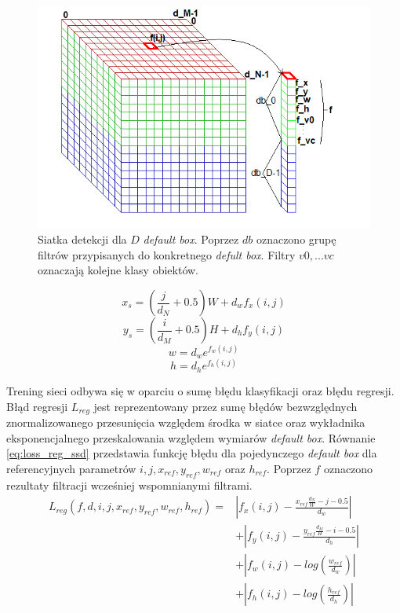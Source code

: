 \begin{figure}
    \centering
    \includegraphics[width=0.9\linewidth]{images/ssd_grid_marked.png}
    \caption{Siatka detekcji dla $D$ \emph{default box}. Poprzez $db$ oznaczono grupę filtrów przypisanych do konkretnego \emph{defult box}. Filtry $v0,...vc$ oznaczają kolejne klasy obiektów.}
    \label{fig:ssd_grid}
\end{figure}
\begin{equation}
x_s = (\frac{j}{d_N}+ 0.5)W + d_w f_x(i,j)
\label{eq:xs_ssd}
\end{equation}
\begin{equation}
y_s = (\frac{i}{d_M}+ 0.5)H + d_h f_y(i,j)
\label{eq:ys_ssd}
\end{equation}
\begin{equation}
w = d_we^{f_w(i,j)}
\label{eq:w_ssd}
\end{equation}
\begin{equation}
h = d_he^{f_h(i,j)}
\label{eq:h_ssd}
\end{equation}

Trening sieci odbywa się w oparciu o sumę błędu klasyfikacji oraz błędu regresji.
Błąd regresji $L_{reg}$ jest reprezentowany przez sumę błędów bezwzględnych znormalizowanego przesunięcia względem środka w siatce oraz wykładnika eksponencjalnego przeskalowania względem wymiarów \emph{default box}. 
Równanie \eqref{eq:loss_reg_ssd} przedstawia funkcję błędu dla pojedynczego \emph{default box} dla referencyjnych parametrów $i, j, x_{ref}, y_{ref}, w_{ref}$ oraz $h_{ref}$.
Poprzez $f$ oznaczono rezultaty filtracji wcześniej wspomnianymi filtrami.
\begin{equation}
\begin{aligned}
L_{reg}(f, d, i, j, x_{ref}, y_{ref}, w_{ref}, h_{ref}) 
=& |f_x(i,j) - \frac{x_{ref}\frac{d_N}{W} - j - 0.5}{d_w}| \\
&+ |f_y(i,j) - \frac{y_{ref}\frac{d_M}{H} - i - 0.5}{d_h}| \\
&+ |f_w(i,j) - log(\frac{w_{ref}}{d_w})|\\
&+ |f_h(i,j) - log(\frac{h_{ref}}{d_h})|
\end{aligned}
\label{eq:loss_reg_ssd}
\end{equation}

